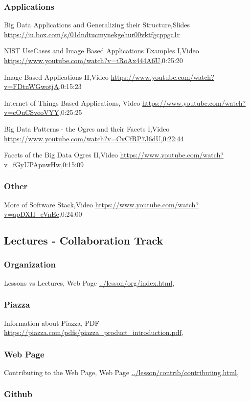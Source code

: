 \subsubsection{Applications}

Big Data Applications and Generalizing their Structure,Slides \url{https://iu.box.com/s/01dndtucmynekgehur00vktfgcppgc1r}

NIST UseCases and Image Based Applications Examples I,Video \url{https://www.youtube.com/watch?v=tRoAx444A6U},0:25:20

Image Based Applications II,Video \url{https://www.youtube.com/watch?v=FDtnWGwotjA},0:15:23

Internet of Things Based Applications, Video \url{https://www.youtube.com/watch?v=cOuCSveoVYY},0:25:25

Big Data Patterns - the Ogres and their Facets I,Video \url{https://www.youtube.com/watch?v=CvCfRP7J6dU},0:22:44

Facets of the Big Data Ogres II,Video \url{https://www.youtube.com/watch?v=fGyUPApnwHw},0:15:09

\subsubsection{Other}

More of Software Stack,Video \url{https://www.youtube.com/watch?v=apDXH_eVnEc},0:24:00

\subsection{Lectures - Collaboration Track}\label{lectures---collaboration-track}


\subsubsection{Organization}
 Lessons vs Lectures, Web Page \url{../lesson/org/index.html},
\subsubsection{Piazza}
 Information about Piazza, PDF \url{https://piazza.com/pdfs/piazza_product_introduction.pdf},
\subsubsection{Web Page}
 Contributing to the Web Page, Web Page \url{../lesson/contrib/contributing.html},


\subsubsection{Github}
 
